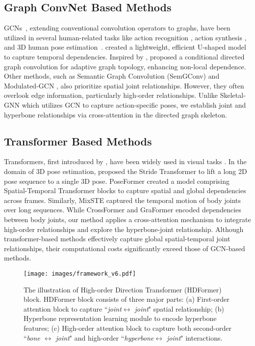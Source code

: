 \documentclass{article}
\begin{document}
\subsection{Graph ConvNet Based Methods}
GCNs~\cite{scarselli2008graph,gilmer2017neural}, extending conventional convolution operators to graphs, have been utilized in several human-related tasks like action recognition \cite{shi2019skeleton,shi2019-twostream,xiang2022language}, action synthesis \cite{yan2019convolutional}, and 3D human pose estimation~\cite{zhou2022hypergraph}. \cite{wang2020-motion} created a lightweight, efficient U-shaped model to capture temporal dependencies. Inspired by \cite{shi2019skeleton}, \cite{hu(2021)-conditional} proposed a conditional directed graph convolution for adaptive graph topology, enhancing non-local dependence. Other methods, such as Semantic Graph Convolution (SemGConv) \cite{zhao2019semantic} and Modulated-GCN \cite{zou2021-modulated}, also prioritize spatial joint relationships. However, they often overlook edge information, particularly high-order relationships. Unlike Skeletal-GNN \cite{zeng2021learning} which utilizes GCN to capture action-specific poses, we establish joint and hyperbone relationships via cross-attention in the directed graph skeleton.

\subsection{Transformer Based Methods}
Transformers, first introduced by \cite{vaswani2017attention}, have been widely used in visual tasks \cite{zhou2022hypergraph,tu2023implicit,cheng2022gsrformer}. In the domain of 3D pose estimation, \cite{li2022-exploiting} proposed the Stride Transformer to lift a long 2D pose sequence to a single 3D pose. PoseFormer \cite{zheng(2021)-poseformer} created a model comprising Spatial-Temporal Transformer blocks to capture spatial and global dependencies across frames. Similarly, MixSTE \cite{ZhangCVPR22MixSTE} captured the temporal motion of body joints over long sequences. While CrossFormer \cite{hassanin2022crossformer} and GraFormer \cite{zhao2022-graformer} encoded dependencies between body joints, our method applies a cross-attention mechanism to integrate high-order relationships and explore the hyperbone-joint relationship. Although transformer-based methods effectively capture global spatial-temporal joint relationships, their computational costs significantly exceed those of GCN-based methods.

\begin{figure*}[!t]
    \centering
\centerline{\texttt{[image: images/framework\_v6.pdf]}}
    \caption{\small The illustration of High-order Direction Transformer (HDFormer) block. HDFormer block consists of three major parts: (a) First-order attention block to capture ``\textit{joint$\leftrightarrow$ joint}" spatial relationship; (b) Hyperbone representation learning module to encode hyperbone features; (c) High-order attention block to capture both second-order ``\textit{bone $\leftrightarrow$ joint}" and high-order ``\textit{hyperbone$\leftrightarrow$ joint}" interactions. }
    \label{fig:higher order attention block}
\end{figure*}
\end{document}
